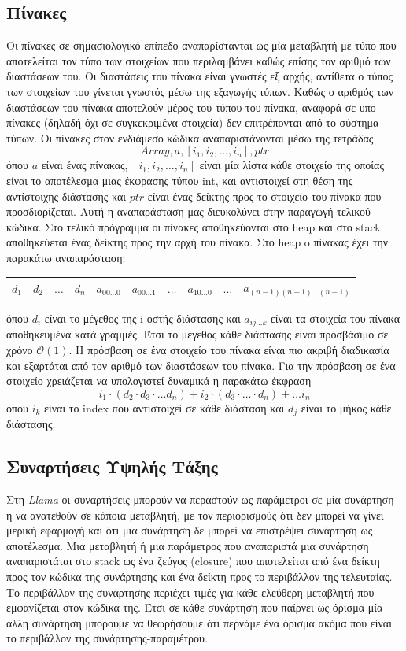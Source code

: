 \documentclass[12pt]{article}
\newcommand{\Llama}{\textit{Llama }}
\begin{document}
\subsection{Πίνακες}
Οι πίνακες σε σημασιολογικό επίπεδο αναπαρίστανται ως μία μεταβλητή με τύπο που αποτελείται τον τύπο των στοιχείων που περιλαμβάνει καθώς επίσης τον αριθμό των διαστάσεων του. Οι διαστάσεις του πίνακα είναι γνωστές εξ αρχής, αντίθετα ο τύπος των στοιχείων του γίνεται γνωστός μέσω της εξαγωγής τύπων. Καθώς ο αριθμός των διαστάσεων του πίνακα αποτελούν μέρος του τύπου του πίνακα, αναφορά σε υπο-πίνακες (δηλαδή όχι σε συγκεκριμένα στοιχεία) δεν επιτρέπονται από το σύστημα τύπων.
Οι πίνακες στον ενδιάμεσο κώδικα αναπαριστάνονται μέσω της τετράδας $$Array, a, [i_1,i_2, \ldots, i_n], ptr$$ όπου $a$ είναι ένας πίνακας, $[i_1, i_2, \ldots, i_n]$ είναι μία λίστα κάθε στοιχείο της οποίας είναι το αποτέλεσμα μιας έκφρασης τύπου int, και αντιστοιχεί στη θέση της αντίστοιχης διάστασης και $ptr$ είναι ένας δείκτης προς το στοιχείο του πίνακα που προσδιορίζεται.  Αυτή η αναπαράσταση μας διευκολύνει στην παραγωγή τελικού κώδικα. Στο τελικό πρόγραμμα οι πίνακες αποθηκεύονται στο heap και στο stack αποθηκεύεται ένας δείκτης προς την αρχή του πίνακα. Στο heap o πίνακας έχει την παρακάτω αναπαράσταση:

\begin{table}[htbp]
\centering
    \begin{tabular}{|l|c|l|l|l|l|l|l|l|c|}
    \hline
    $d_1$ & $d_2$ & $\ldots$ & $d_n$ & $a_{00\ldots0}$ & $a_{00\ldots1}$ & $\ldots$ & $a_{10\ldots0}$ & $\ldots$ & $a_{(n-1)(n-1)\ldots(n-1)}$ \\ \hline
    \end{tabular}
\end{table}
όπου $d_i$ είναι το μέγεθος της i-οστής διάστασης και $a_{ij \ldots k}$ είναι τα στοιχεία του πίνακα αποθηκευμένα κατά γραμμές. Έτσι το μέγεθος κάθε διάστασης είναι προσβάσιμο σε χρόνο $\mathcal{O}(1)$. Η πρόσβαση σε ένα στοιχείο του πίνακα είναι πιο ακριβή διαδικασία και εξαρτάται από τον αριθμό των διαστάσεων του πίνακα. Για την πρόσβαση σε ένα στοιχείο χρειάζεται να υπολογιστεί δυναμικά η παρακάτω έκφραση
$$i_1 \cdot (d_2 \cdot d_3 \cdot \ldots d_n) + i_2 \cdot (d_3 \cdot \ldots \cdot d_n) + \ldots i_n$$
όπου $i_k$ είναι το index που αντιστοιχεί σε κάθε διάσταση και $d_j$ είναι το μήκος κάθε διάστασης.
\subsection{Συναρτήσεις Υψηλής Τάξης}
Στη \Llama οι συναρτήσεις μπορούν να περαστούν ως παράμετροι σε μία συνάρτηση ή να ανατεθούν σε κάποια μεταβλητή, με τον περιορισμούς ότι δεν μπορεί να γίνει μερική εφαρμογή και ότι μια συνάρτηση δε μπορεί να επιστρέψει συνάρτηση ως αποτέλεσμα. Μια μεταβλητή ή μια παράμετρος που αναπαριστά μια συνάρτηση αναπαριστάται στο stack ως ένα ζεύγος (closure) που αποτελείται από ένα δείκτη προς τον κώδικα της συνάρτησης και ένα δείκτη προς το περιβάλλον της τελευταίας. Το περιβάλλον της συνάρτησης περιέχει τιμές για κάθε ελεύθερη μεταβλητή που εμφανίζεται στον κώδικα της. Έτσι σε κάθε συνάρτηση που παίρνει ως όρισμα μία άλλη συνάρτηση μπορούμε να θεωρήσουμε ότι περνάμε ένα όρισμα ακόμα που είναι το περιβάλλον της συνάρτησης-παραμέτρου.
\end{document}
